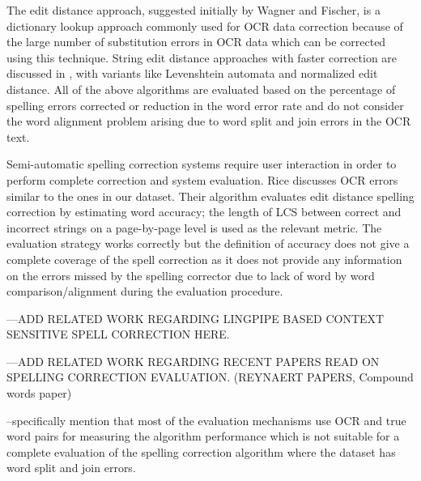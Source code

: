 \documentclass[preprint,11pt]{elsarticle}
\begin{document}
The edit distance approach, suggested initially by Wagner and Fischer\cite{wagner1974string}, is a dictionary lookup approach commonly used for OCR data correction because of the large number of substitution errors in OCR data  \cite{kukich1992techniques}\cite{christen2006comparison} which can be corrected using this technique. String edit distance approaches with faster correction are discussed in \cite{marzal1993computation},\cite{schulz2002fast}  with variants like Levenshtein automata and normalized edit distance.
All of the above algorithms are evaluated based on the percentage of spelling errors corrected or reduction in the word error rate and do not consider the word alignment problem arising due to word split and join errors in the OCR text. 

Semi-automatic spelling correction systems \cite{taghva2001ocrspell} require user interaction in order to perform complete correction and system evaluation. Rice\cite{rice1996measuring} discusses OCR errors similar to the ones in our dataset. Their algorithm evaluates edit distance spelling correction by estimating word accuracy; the length of LCS between correct and incorrect strings on a page-by-page level is used as the relevant metric. 
The evaluation strategy works correctly but the definition of accuracy does not give a complete coverage of the spell correction as it does not provide any information on the errors missed by the spelling corrector due to lack of word by word comparison/alignment during the evaluation procedure.

---ADD RELATED WORK REGARDING LINGPIPE BASED CONTEXT SENSITIVE SPELL CORRECTION HERE. 

---ADD RELATED WORK REGARDING RECENT PAPERS READ ON SPELLING CORRECTION EVALUATION. (REYNAERT PAPERS, Compound words paper)

--specifically mention that most of the evaluation mechanisms use OCR and true word pairs for measuring the algorithm performance which is not suitable for a complete evaluation of the spelling correction algorithm where the dataset has word split and join errors.
\end{document}
